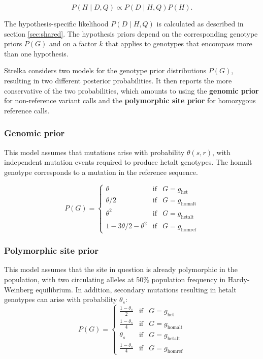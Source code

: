 \documentclass{article}
\begin{document}
\begin{equation*}
\label{eq:posterior}
P(H \mid D,Q) \propto P(D \mid H,Q)P(H).
\end{equation*}

The hypothesis-specific likelihood $P(D \mid H,Q)$ is calculated as described in section \ref{sec:shared}. The hypothesis priors depend on the corresponding genotype priors $P(G)$ and on a factor $k$ that applies to genotypes that encompass more than one hypothesis.

Strelka considers two models for the genotype prior distributions $P(G)$, resulting in two different posterior probabilities. It then reports the more conservative of the two probabilities, which amounts to using the {\bf genomic prior} for non-reference variant calls and the {\bf polymorphic site prior} for homozygous reference calls.

\subsubsection{Genomic prior}
\label{sec:germline_genomic_prior}
This model assumes that mutations arise with probability $\theta(s,r)$, with independent mutation events required to produce hetalt genotypes. The homalt genotype corresponds to a mutation in the reference sequence.

\begin{equation*}
P(G) = \left\{
\begin{array}{lcl}
\theta & \mathrm{if} & G=g_\mathrm{het}\\
\theta/2 & \mathrm{if} & G=g_\mathrm{homalt}\\
\theta^2 & \mathrm{if} & G=g_\mathrm{hetalt}\\
1 -3\theta/2 -\theta^2 & \mathrm{if} & G=g_\mathrm{homref}
\end{array} \right.
\end{equation*}

\subsubsection{Polymorphic site prior}
This model assumes that the site in question is already polymorphic in the population, with two circulating alleles at 50\% population frequency in Hardy-Weinberg equilibrium. In addition, secondary mutations resulting in hetalt genotypes can arise with probability $\theta_s$:
\begin{equation*}
P(G) = \left\{
\begin{array}{lcl}
\frac{1-\theta_s}{2} & \mathrm{if} & G=g_\mathrm{het}\\
\frac{1-\theta_s}{4} & \mathrm{if} & G=g_\mathrm{homalt}\\
\theta_s & \mathrm{if} & G=g_\mathrm{hetalt}\\
\frac{1-\theta_s}{4} & \mathrm{if} & G=g_\mathrm{homref}
\end{array} \right.
\end{equation*}
\end{document}
